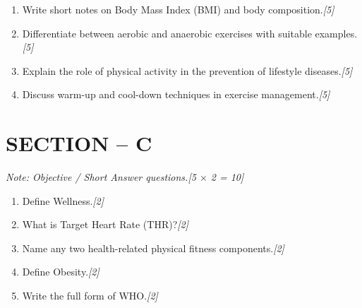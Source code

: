\documentclass[11pt,a4paper]{article}
\newcommand{\pts}[1]{\hfill \textit{[#1]}}
\begin{document}
\begin{enumerate}[label=\textbf{\arabic*.},leftmargin=*,start=5,itemsep=8pt]

  \item Write short notes on Body Mass Index (BMI) and body composition.\pts{5}

  \item Differentiate between aerobic and anaerobic exercises with suitable examples.\pts{5}

  \item Explain the role of physical activity in the prevention of lifestyle diseases.\pts{5}

  \item Discuss warm-up and cool-down techniques in exercise management.\pts{5}

\end{enumerate}

\bigskip

\section*{SECTION -- C}
\noindent \textit{Note: Objective / Short Answer questions.}\pts{5 $\times$ 2 = 10}

\begin{enumerate}[label=\textbf{\arabic*.},leftmargin=*,start=9,itemsep=6pt]

  \item Define Wellness.\pts{2}
  \item What is Target Heart Rate (THR)?\pts{2}
  \item Name any two health-related physical fitness components.\pts{2}
  \item Define Obesity.\pts{2}
  \item Write the full form of WHO.\pts{2}

\end{enumerate}
\end{document}

